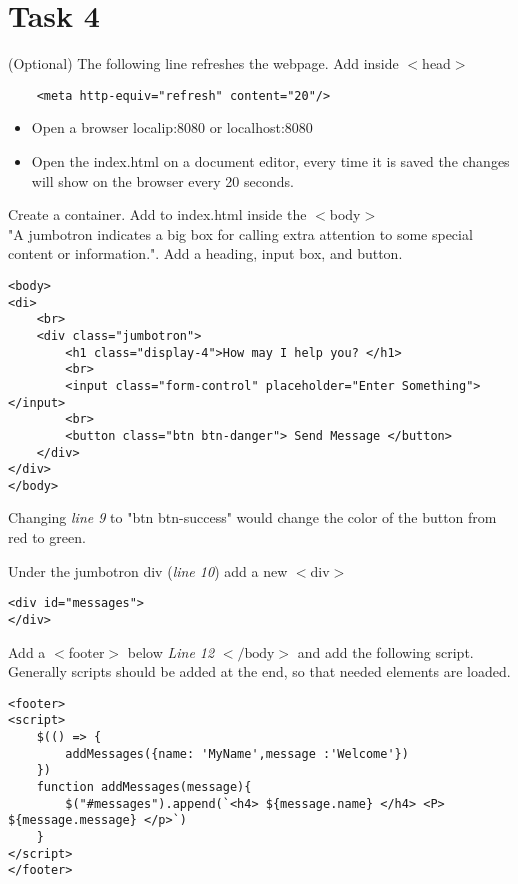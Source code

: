 \documentclass[12pt]{article}
\begin{document}
\section*{Task 4}
\begin{todolist}
    \item (Optional) The following line refreshes the webpage. Add inside $<$head$>$ 
    \begin{lstlisting}
    <meta http-equiv="refresh" content="20"/> 
    \end{lstlisting}
    \begin{itemize}
        \item Open a browser localip:8080 or localhost:8080
        \item Open the index.html on a document editor, every time it is saved the changes will show on the browser every 20 seconds. 
    \end{itemize}
    \item Create a container. Add to index.html inside the $<$body$> $ \\
     "A jumbotron indicates a big box for calling extra attention to some special content or information.". Add a heading, input box, and button. 
\begin{lstlisting}
<body> 
<di> 
    <br> 
    <div class="jumbotron"> 
        <h1 class="display-4">How may I help you? </h1> 
        <br> 
        <input class="form-control" placeholder="Enter Something"> </input> 
        <br> 
        <button class="btn btn-danger"> Send Message </button> 
    </div> 
</div> 
</body> 
\end{lstlisting}
    Changing \textit{line 9} to "btn btn-success" would change the color of the button from red to green. 
    \item Under the jumbotron div (\textit{line 10}) add a new $<$div$>$
\begin{lstlisting}
<div id="messages"> 
</div> 
\end{lstlisting}
    \item  Add a $<$footer$>$ below \textit{Line 12} $</\text{body}>$ and add the following script. Generally scripts should be added at the end, so that needed elements are loaded. 
    \begin{lstlisting}
<footer> 
<script> 
    $(() => {
        addMessages({name: 'MyName',message :'Welcome'})
    })
    function addMessages(message){
        $("#messages").append(`<h4> ${message.name} </h4> <P> ${message.message} </p>`)
    }
</script> 
</footer> 
\end{lstlisting}
\end{todolist}
\end{document}
